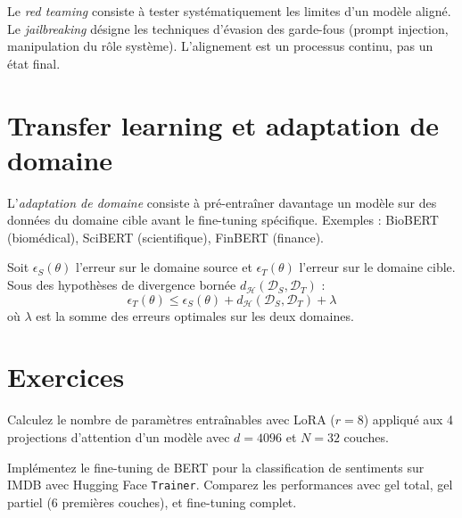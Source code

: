 \begin{attention}[title=\textbf{Red teaming et jailbreaking}]
Le \emph{red teaming} consiste \`a tester syst\'ematiquement les limites d'un
mod\`ele align\'e. Le \emph{jailbreaking} d\'esigne les techniques
d'\'evasion des garde-fous (prompt injection, manipulation du r\^ole syst\`eme).
L'alignement est un processus continu, pas un \'etat final.
\end{attention}

\section{Transfer learning et adaptation de domaine}
\label{sec:ft:transfer}

\begin{definition}
L'\emph{adaptation de domaine} consiste \`a pr\'e-entra\^iner davantage un
mod\`ele sur des donn\'ees du domaine cible avant le fine-tuning sp\'ecifique.
Exemples : BioBERT (biom\'edical), SciBERT (scientifique), FinBERT (finance).
\end{definition}

\begin{theoreme}
Soit $\epsilon_S(\theta)$ l'erreur sur le domaine source et
$\epsilon_T(\theta)$ l'erreur sur le domaine cible. Sous des hypoth\`eses de
divergence born\'ee $d_{\mathcal{H}}(\mathcal{D}_S, \mathcal{D}_T)$ :
\[
\epsilon_T(\theta) \leq \epsilon_S(\theta) + d_{\mathcal{H}}(\mathcal{D}_S, \mathcal{D}_T) + \lambda
\]
o\`u $\lambda$ est la somme des erreurs optimales sur les deux domaines.
\end{theoreme}

\section{Exercices}
\label{sec:ft:exercices}

\begin{exercice}[$\star$]
Calculez le nombre de param\`etres entra\^inables avec LoRA ($r=8$) appliqu\'e
aux 4 projections d'attention d'un mod\`ele avec $d = 4096$ et $N = 32$ couches.
\end{exercice}

\begin{exercice}[$\star\star$]
Impl\'ementez le fine-tuning de BERT pour la classification de sentiments sur
IMDB avec Hugging Face \texttt{Trainer}. Comparez les performances avec gel
total, gel partiel (6 premi\`eres couches), et fine-tuning complet.
\end{exercice}

